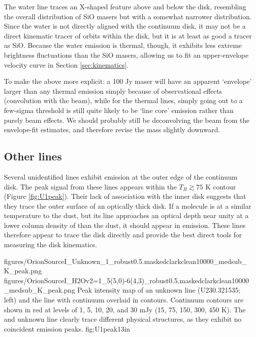 \documentclass[twocolumn]{aastex61}
\begin{document}
The water line traces an X-shaped feature above and below the disk, 
resembling the overall distribution of SiO masers but with a somewhat narrower
distribution.  Since the water is not directly aligned with the continuum
disk, it may not be a direct kinematic tracer of orbits within the disk,
but it is at least as good a tracer as SiO.  Because the water emission is
thermal, though, it exhibits less extreme brightness fluctuations than 
the SiO masers, allowing us to fit an upper-envelope velocity curve in Section
\ref{sec:kinematics}.

{\color{red} To make the above more explicit: a 100 Jy maser will have an
apparent `envelope' larger than any thermal emission simply because of observational
effects (convolution with the beam), while for the thermal lines, simply going out
to a few-sigma threshold is still quite likely to be `line core' emission rather
than purely beam effects.  We should probably still be deconvolving the beam from
the envelope-fit estimates, and therefore revise the mass slightly downward.}


\subsection{Other lines}
Several unidentified lines exhibit emission at the outer edge of the continuum disk.
The peak signal from these lines appears within the $T_B\gtrsim75$ K contour
(Figure \ref{fig:U1peak}).
Their lack of association with the inner disk suggests that they trace the outer
surface of an optically thick disk.
If a molecule is at a similar temperature to the dust, but its line approaches
an optical depth near unity at a lower column density of \hh than the dust,
it should appear in emission.  These lines therefore appear to trace the disk
directly and provide the best direct tools for measuring the disk kinematics.

\FigureTwo
{{figures/OrionSourceI_Unknown_1_robust0.5.maskedclarkclean10000_medsub_K_peak}.png}
{{figures/OrionSourceI_H2Ov2=1_5(5,0)-6(4,3)_robust0.5.maskedclarkclean10000_medsub_K_peak}.png}
{Peak intensity map of an unknown line (U230.321535; left) and the \water
line with continuum overlaid
in contours.  Continuum contours are shown in red at levels of 1, 5, 10, 20, and 30
mJy \perbeam (15, 75, 150, 300, 450 K).
The \water and unknown line clearly trace different physical structures, as
they exhibit no coincident emission peaks.
}
{fig:U1peak}{1}{3in}
\end{document}
